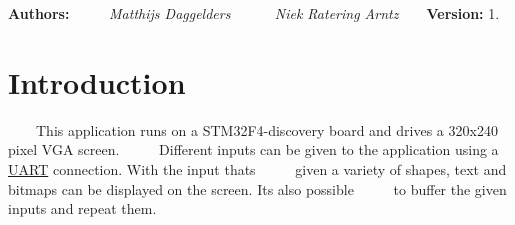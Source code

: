 {\bfseries Authors\+:}~\newline
 ~~~~{\itshape  Matthijs Daggelders }~\newline
 ~~~~{\itshape  Niek Ratering Arntz }~\newline
 ~\newline
 {\bfseries Version\+:} 1.~\newline
\hypertarget{index_intro_sec}{}\section{Introduction}\label{index_intro_sec}
~~~~This application runs on a S\+T\+M32\+F4-\/discovery board and drives a 320x240 pixel V\+GA screen.~\newline
 ~~~~Different inputs can be given to the application using a \mbox{\hyperlink{namespace_u_a_r_t}{U\+A\+RT}} connection. With the input thats~\newline
 ~~~~given a variety of shapes, text and bitmaps can be displayed on the screen. It\textquotesingle{}s also possible~\newline
 ~~~~to buffer the given inputs and repeat them.~\newline


